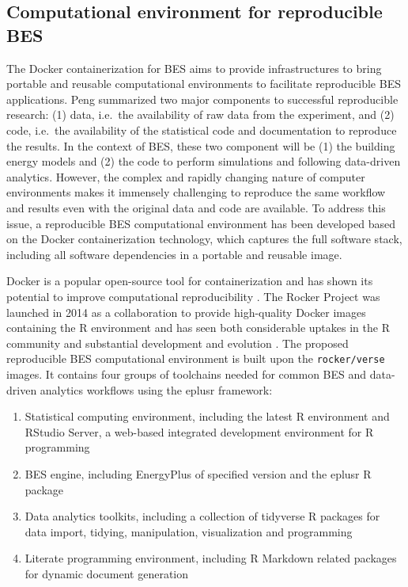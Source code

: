 \documentclass[3p, times]{elsarticle} %
\providecommand{\tightlist}{%
  \setlength{\itemsep}{0pt}\setlength{\parskip}{0pt}}
\begin{document}
\hypertarget{sec:docker}{%
\subsection{Computational environment for reproducible BES}\label{sec:docker}}

The Docker containerization for BES aims to provide infrastructures to bring
portable and reusable computational environments to facilitate reproducible BES
applications.
Peng \citep{Peng2015} summarized two major components to successful reproducible
research: (1) data, i.e.~the availability of raw data from the experiment, and
(2) code, i.e.~the availability of the statistical code and documentation to
reproduce the results.
In the context of BES, these two component will be (1) the building energy
models and (2) the code to perform simulations and following data-driven
analytics.
However, the complex and rapidly changing nature of computer environments
makes it immensely challenging to reproduce the same workflow and results even
with the original data and code are available.
To address this issue, a reproducible BES computational environment has been
developed based on the Docker containerization technology, which captures the
full software stack, including all software dependencies in a portable and
reusable image.

Docker \citep{Merkel2014} is a popular open-source tool for containerization and has
shown its potential to improve computational reproducibility \citep{Boettiger2015, Nust2020}. The Rocker Project was launched in 2014 as a collaboration to
provide high-quality Docker images containing the R environment and has seen
both considerable uptakes in the R community and substantial development and
evolution \citep{Boettiger2017}. The proposed reproducible BES computational
environment is built upon the \texttt{rocker/verse} images. It contains four groups of
toolchains needed for common BES and data-driven analytics workflows using the
eplusr framework:

\begin{enumerate}
\def\labelenumi{\arabic{enumi}.}
\tightlist
\item
  Statistical computing environment, including the latest R environment and
  RStudio Server, a web-based integrated development environment for R
  programming
\item
  BES engine, including EnergyPlus of specified version and the eplusr R
  package
\item
  Data analytics toolkits, including a collection of tidyverse \citep{Wickham2019}
  R packages for data import, tidying, manipulation, visualization and
  programming
\item
  Literate programming environment, including R Markdown related packages
  for dynamic document generation
\end{enumerate}
\end{document}
